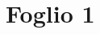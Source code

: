 \documentclass{article}
\begin{document}
\tableofcontents

\newpage

\section{Foglio 1}

\end{document}

